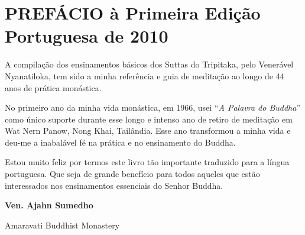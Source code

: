 \chapter{PREFÁCIO à Primeira Edição Portuguesa de 2010}

A compilação dos ensinamentos básicos dos Suttas do Tripitaka, pelo Venerável Nyanatiloka, tem sido a minha referência e guia de meditação ao longo de 44 anos de prática monástica.

No primeiro ano da minha vida monástica, em 1966, usei ``\emph{A Palavra do Buddha}'' como único suporte durante esse longo e intenso ano de retiro de meditação em Wat Nern Panow, Nong Khai, Tailândia. Esse ano transformou a minha vida e deu-me a inabalável fé na prática e no ensinamento do Buddha.

Estou muito feliz por termos este livro tão importante traduzido para a língua portuguesa. Que seja de grande benefício para todos aqueles que estão interessados nos ensinamentos essenciais do Senhor Buddha.

\textbf{Ven. Ajahn Sumedho}

Amaravati Buddhist Monastery
